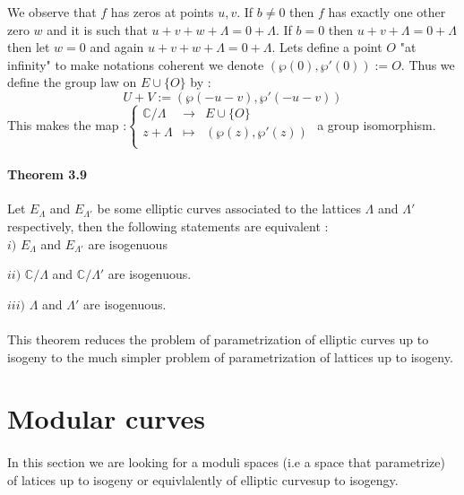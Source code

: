 \documentclass[letterpaper,10pt]{article}
\begin{document}
We observe that $f$ has zeros at points $u,v$.
If $ b \neq 0$ then $f$ has exactly one other zero $w$ and it is such that  $u + v + w + \Lambda = 0 + \Lambda$.
If $b = 0$ then $u + v + \Lambda = 0 + \Lambda$ then let $w = 0$ and again $u + v + w + \Lambda = 0 + \Lambda$.
Lets define a point $O$ "at infinity" to make notations coherent we denote $(\wp(0),\wp'(0)) := O$.
Thus we define the group law on $E\cup\{O\}$ by : \[ U + V := (\wp(-u - v),\wp'(-u -v)) \]
This makes the map :$  \left\{ \begin{array}{rcl} \mathbb{C}/\Lambda & \longrightarrow & E\cup \{O\} \\
  z + \Lambda & \longmapsto & (\wp(z),\wp'(z)) \\ \end{array} \right. $ a group isomorphism.



\paragraph{Theorem 3.9} Let $E_{\Lambda}$ and $E_{\Lambda'}$ be some elliptic curves associated to the lattices $\Lambda$ and $\Lambda'$ respectively,
then the following statements are equivalent :\\

  $i)$ $E_{\Lambda}$ and $E_{\Lambda'}$ are isogenuous
  
  $ii)$  $\mathbb{C}/\Lambda$ and $\mathbb{C}/\Lambda'$ are isogenuous.
  
  $iii)$  $\Lambda$ and $\Lambda'$ are isogenuous. \\ 
  
{\itshape \paragraph{}This theorem reduces the problem of parametrization of elliptic curves up to isogeny to the much simpler problem of parametrization of
 lattices up to isogeny.
}

\section{Modular curves}%

{\itshape \paragraph{} In this section we are looking for a moduli spaces (i.e a space that parametrize) of latices up to isogeny 
or equivlalently of elliptic curvesup to isogengy.
}
\end{document}
